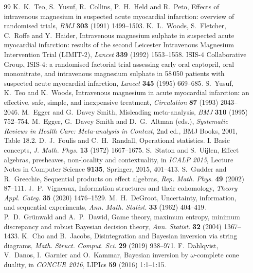 \documentclass[11pt]{article}
\theoremstyle{definition}\newtheorem{definition}{Definition}\newtheorem{remark}{Remark}
\begin{document}
\begin{thebibliography}{99}
 K.~K.~Teo, S.~Yusuf, R.~Collins, P.~H.~Held and R.~Peto, Effects of intravenous magnesium in suspected acute myocardial infarction: overview of randomised trials, \emph{BMJ} \textbf{303} (1991) 1499--1503.
 K.~L.~Woods, S.~Fletcher, C.~Roffe and Y.~Haider, Intravenous magnesium sulphate in suspected acute myocardial infarction: results of the second Leicester Intravenous Magnesium Intervention Trial (LIMIT-2), \emph{Lancet} \textbf{339} (1992) 1553--1558.
 ISIS-4 Collaborative Group, ISIS-4: a randomised factorial trial assessing early oral captopril, oral mononitrate, and intravenous magnesium sulphate in 58\,050 patients with suspected acute myocardial infarction, \emph{Lancet} \textbf{345} (1995) 669--685.
 S.~Yusuf, K.~Teo and K.~Woods, Intravenous magnesium in acute myocardial infarction: an effective, safe, simple, and inexpensive treatment, \emph{Circulation} \textbf{87} (1993) 2043--2046.
 M.~Egger and G.~Davey Smith, Misleading meta-analysis, \emph{BMJ} \textbf{310} (1995) 752--754.
 M.~Egger, G.~Davey Smith and D.~G.~Altman (eds.), \emph{Systematic Reviews in Health Care: Meta-analysis in Context}, 2nd ed., BMJ Books, 2001, Table 18.2.
 D.~J.~Foulis and C.~H.~Randall, Operational statistics. I. Basic concepts, \emph{J. Math. Phys.} \textbf{13} (1972) 1667--1675.
 S.~Staton and S.~Uijlen, Effect algebras, presheaves, non-locality and contextuality, in \emph{ICALP 2015}, Lecture Notes in Computer Science \textbf{9135}, Springer, 2015, 401--413.
 S.~Gudder and R.~Greechie, Sequential products on effect algebras, \emph{Rep. Math. Phys.} \textbf{49} (2002) 87--111.
 J.~P.~Vigneaux, Information structures and their cohomology, \emph{Theory Appl. Categ.} \textbf{35} (2020) 1476--1529.
 M.~H.~DeGroot, Uncertainty, information, and sequential experiments, \emph{Ann. Math. Statist.} \textbf{33} (1962) 404--419.
 P.~D.~Gr\"unwald and A.~P.~Dawid, Game theory, maximum entropy, minimum discrepancy and robust Bayesian decision theory, \emph{Ann. Statist.} \textbf{32} (2004) 1367--1433.
 K.~Cho and B.~Jacobs, Disintegration and Bayesian inversion via string diagrams, \emph{Math. Struct. Comput. Sci.} \textbf{29} (2019) 938--971.
 F.~Dahlqvist, V.~Danos, I.~Garnier and O.~Kammar, Bayesian inversion by $\omega$-complete cone duality, in \emph{CONCUR 2016}, LIPIcs \textbf{59} (2016) 1:1--1:15.
\end{thebibliography}
\end{document}
